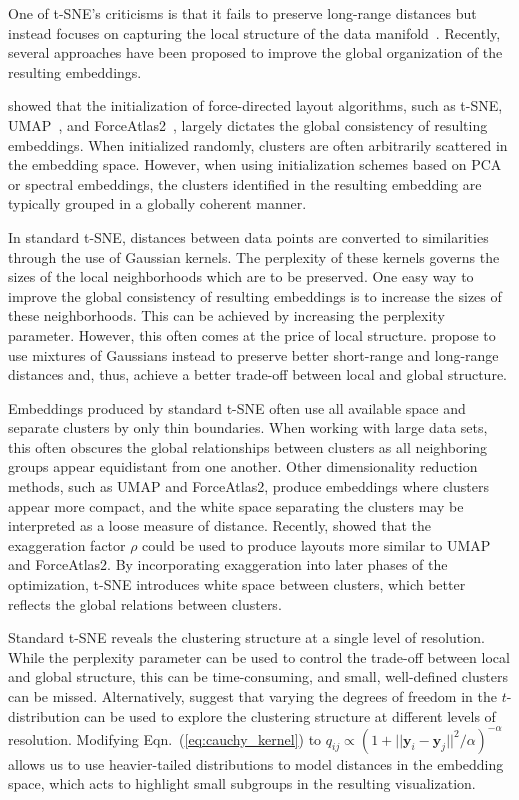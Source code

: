\documentclass[article]{jss}
\begin{document}
One of t-SNE's criticisms is that it fails to preserve long-range distances but instead focuses on capturing the local structure of the data manifold~\citep{becht2019dimensionality}. Recently, several approaches have been proposed to improve the global organization of the resulting embeddings.

\citet{kobak2019umap} showed that the initialization of force-directed layout algorithms, such as t-SNE, UMAP~\citep{2018arXivUMAP}, and ForceAtlas2~\citep{jacomy2014forceatlas2}, largely dictates the global consistency of resulting embeddings. When initialized randomly, clusters are often arbitrarily scattered in the embedding space. However, when using initialization schemes based on PCA or spectral embeddings, the clusters identified in the resulting embedding are typically grouped in a globally coherent manner.

In standard t-SNE, distances between data points are converted to similarities through the use of Gaussian kernels. The perplexity of these kernels governs the sizes of the local neighborhoods which are to be preserved. One easy way to improve the global consistency of resulting embeddings is to increase the sizes of these neighborhoods. This can be achieved by increasing the perplexity parameter. However, this often comes at the price of local structure. \citet{kobak2019art} propose to use mixtures of Gaussians instead to preserve better short-range and long-range distances and, thus, achieve a better trade-off between local and global structure.

Embeddings produced by standard t-SNE often use all available space and separate clusters by only thin boundaries. When working with large data sets, this often obscures the global relationships between clusters as all neighboring groups appear equidistant from one another.  Other dimensionality reduction methods, such as UMAP and ForceAtlas2, produce embeddings where clusters appear more compact, and the white space separating the clusters may be interpreted as a loose measure of distance. Recently, \citet{bohm2020unifying} showed that the exaggeration factor $\rho$ could be used to produce layouts more similar to UMAP and ForceAtlas2. By incorporating exaggeration into later phases of the optimization, t-SNE introduces white space between clusters, which better reflects the global relations between clusters.

Standard t-SNE reveals the clustering structure at a single level of resolution. While the perplexity parameter can be used to control the trade-off between local and global structure, this can be time-consuming, and small, well-defined clusters can be missed. Alternatively, \citet{kobak2019heavy} suggest that varying the degrees of freedom in the $t$-distribution can be used to explore the clustering structure at different levels of resolution. Modifying Eqn.~(\ref{eq:cauchy_kernel}) to $q_{ij} \propto \left ( 1 + || \mathbf{y}_i - \mathbf{y}_j ||^2 / \alpha \right )^{-\alpha}$ allows us to use heavier-tailed distributions to model distances in the embedding space, which acts to highlight small subgroups in the resulting visualization.
\end{document}
